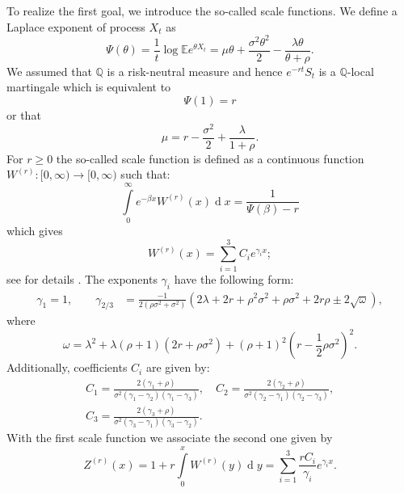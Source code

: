 \documentclass[10pt]{amsart}
\def\E{{\mathbb{E}}}
\def\Q{{\mathbb{Q}}}
\def \R{{{\rm I{\!}\rm R}}}
\newcommand{\dx}{\operatorname{d}\!}
\def\E{{\mathbb E}} \def\PP{\mc P} \def\Z{{\mathbb Z}} \def\R{{\mathbb R}}
\begin{document}
	To realize the first goal, we introduce the so-called scale functions.
	We define a Laplace exponent of process $X_t$ as
	\begin{equation*}
		\Psi(\theta) = \frac{1}{t}\log\E e^{\theta X_t}=
		\mu\theta + \frac{\sigma^2\theta^2}{2} - \frac{\lambda\theta}{\theta + \rho}.
	\end{equation*}
	We assumed that $\Q$ is a risk-neutral measure and hence $e^{-rt}S_t$ is a $\Q$-local martingale which is equivalent to
	\begin{equation*}
		\label{Psi1}\Psi(1) = r
	\end{equation*}
	or that
	\begin{equation*}
		\mu = r - \frac{\sigma^2}{2} +  \frac{\lambda}{1+\rho}.
	\end{equation*}
	For $r \geq 0$ the so-called scale function is defined as a continuous function $W^{(r)}:[ 0,\infty ) \rightarrow [ 0,\infty ) $ such that:
	\begin{equation*}
		\int\limits_0^\infty e^{-\beta x}W^{(r)}(x)\dx x = \frac{1}{\Psi(\beta)-r}
	\end{equation*}
	which gives
	\begin{equation}\label{W_sum}
		W^{(r)}(x) = \sum_{i=1}^3 C_i e^{\gamma_i x};
	\end{equation}
	see for details \cite{ZP&PS}.
	The exponents $\gamma_i$ have the following form:
	\begin{align}
		\gamma_1 = 1, \qquad
		\gamma_{2/3} &= \frac{-1}{2(\rho\sigma^2 + \sigma^2)}\left(2\lambda + 2r + \rho^2\sigma^2 + \rho\sigma^2 + 2r\rho \pm 2\sqrt{\omega}\right), \label{eta2}
	\end{align}
	where
	\begin{equation*}
		\omega = \lambda^2 + \lambda (\rho+1)(2r+\rho\sigma^2) + (\rho+1)^2 \left(r - \frac{1}{2}\rho\sigma^2\right)^2.
	\end{equation*}
	Additionally, coefficients $C_i$ are given by:
	\begin{align*}
		C_1 = \frac{2(\gamma_1+\rho)}{\sigma^2(\gamma_1 - \gamma_2)(\gamma_1 - \gamma_3)},\quad %
		C_2 = \frac{2(\gamma_2+\rho)}{\sigma^2(\gamma_2 - \gamma_1)(\gamma_2 - \gamma_3)},
		\\
		C_3 = \frac{2(\gamma_3+\rho)}{\sigma^2(\gamma_3 - \gamma_1)(\gamma_3 - \gamma_2)}.
	\end{align*}
	With the first scale function we associate the second one given by
	\begin{equation}\label{Z_def}
		Z^{(r)}(x) = 1 + r\int\limits_{0}^{x} W^{(r)}(y)\dx y=\sum_{i=1}^3 \frac{rC_i}{\gamma_i} e^{\gamma_i x}.
	\end{equation}
	
\end{document}
